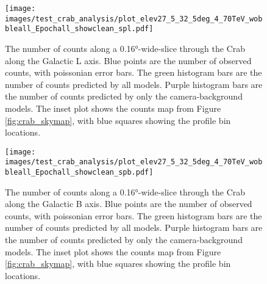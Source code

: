   \begin{figure}[h]
    \centering
    \texttt{[image: images/test\_crab\_analysis/plot\_elev27\_5\_32\_5deg\_4\_70TeV\_wobbleall\_Epochall\_showclean\_spl.pdf]}
    \caption[Crab Profile along Galactic L]
    {
      The number of counts along a \ang{0.16}-wide-slice through the Crab along the Galactic L axis.
      Blue points are the number of observed counts, with poissonian error bars.
      The green histogram bars are the number of counts predicted by all models.
      Purple histogram bars are the number of counts predicted by only the camera-background models.
      The inset plot shows the counts map from Figure \ref{fig:crab_skymap}, with blue squares showing the profile bin locations.
    }
    \label{fig:crab_profile_l}
  \end{figure}

  \begin{figure}[h]
    \centering
    \texttt{[image: images/test\_crab\_analysis/plot\_elev27\_5\_32\_5deg\_4\_70TeV\_wobbleall\_Epochall\_showclean\_spb.pdf]}
    \caption[Crab Profile along Galactic B]
    {
      The number of counts along a \ang{0.16}-wide-slice through the Crab along the Galactic B axis.
      Blue points are the number of observed counts, with poissonian error bars.
      The green histogram bars are the number of counts predicted by all models.
      Purple histogram bars are the number of counts predicted by only the camera-background models.
      The inset plot shows the counts map from Figure \ref{fig:crab_skymap}, with blue squares showing the profile bin locations.
    }
    \label{fig:crab_profile_b}
  \end{figure}
    
